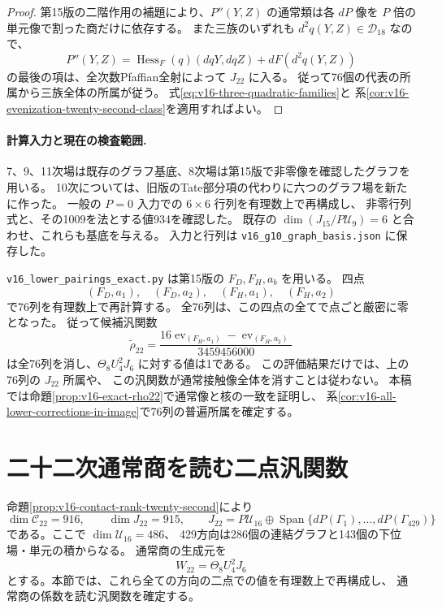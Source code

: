 \documentclass[a4paper,11pt]{ltjsarticle}
\theoremstyle{definition}
\begin{document}
\begin{proof}
第15版の二階作用の補題により、$P''(Y,Z)$ の通常類は各 $dP$ 像を
$P$ 倍の単元像で割った商だけに依存する。
また三族のいずれも $d^2q(Y,Z)\in\mathcal D_{18}$ なので、
\[
 P''(Y,Z)=\operatorname{Hess}_F(q)(dqY,dqZ)+dF(d^2q(Y,Z))
\]
の最後の項は、全次数Pfaffian全射によって $J_{22}$ に入る。
従って76個の代表の所属から三族全体の所属が従う。
式\eqref{eq:v16-three-quadratic-families}と
系\ref{cor:v16-evenization-twenty-second-class}を適用すればよい。
\end{proof}

\paragraph{計算入力と現在の検査範囲.}
7、9、11次場は既存のグラフ基底、8次場は第15版で非零像を確認したグラフを用いる。
10次については、旧版のTate部分項の代わりに六つのグラフ場を新たに作った。
一般の $P=0$ 入力での $6\times6$ 行列を有理数上で再構成し、
非零行列式と、その1009を法とする値934を確認した。
既存の $\dim(J_{15}/P\mathcal U_9)=6$ と合わせ、これらも基底を与える。
入力と行列は \nolinkurl{v16_g10_graph_basis.json} に保存した。

\nolinkurl{v16_lower_pairings_exact.py} は第15版の $F_D,F_H,a_b$ を用いる。
四点
\[
 (F_D,a_1),\quad(F_D,a_2),\quad(F_H,a_1),\quad(F_H,a_2)
\]
で76列を有理数上で再計算する。
全76列は、この四点の全てで点ごと厳密に零となった。
従って候補汎関数
\[
 \widetilde\rho_{22}
 =\frac{16\operatorname{ev}_{(F_H,a_1)}-
                \operatorname{ev}_{(F_H,a_2)}}{3459456000}
\]
は全76列を消し、$\Theta_8U_4^2J_6$ に対する値は1である。
この評価結果だけでは、上の76列の $J_{22}$ 所属や、
この汎関数が通常接触像全体を消すことは従わない。
本稿では命題\ref{prop:v16-exact-rho22}で通常像と核の一致を証明し、
系\ref{cor:v16-all-lower-corrections-in-image}で76列の普遍所属を確定する。




\section{二十二次通常商を読む二点汎関数}
\label{sec:v16-exact-twenty-second-detector}

命題\ref{prop:v16-contact-rank-twenty-second}により
\[
 \dim\mathcal C_{22}=916,\qquad
 \dim J_{22}=915,\qquad
 J_{22}=P\mathcal U_{16}
    \oplus\operatorname{Span}\{dP(\Gamma_1),\ldots,dP(\Gamma_{429})\}
\]
である。ここで $\dim\mathcal U_{16}=486$、
429方向は286個の連結グラフと143個の下位場・単元の積からなる。
通常商の生成元を
\[
                      W_{22}=\Theta_8U_4^2J_6
\]
とする。本節では、これら全ての方向の二点での値を有理数上で再構成し、
通常商の係数を読む汎関数を確定する。
\end{document}
